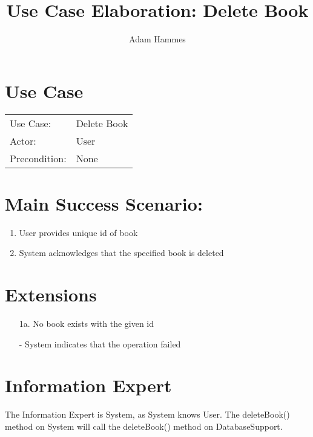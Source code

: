 \documentclass{article}
\title{Use Case Elaboration: Delete Book}
\author{ Adam Hammes }
\begin{document}
\maketitle


\section*{Use Case}
\begin{tabular}{l l}
Use Case:     & Delete Book\\
Actor:        & User\\
Precondition: & None\\
\end{tabular}


\section*{Main Success Scenario:}

\begin{enumerate}
    \item User provides unique id of book
    \item System acknowledges that the specified book is deleted

\end{enumerate}

\section*{Extensions}

\begin{itemize}
    \item [1a.] No book exists with the given id
                
    - System indicates that the operation failed

\end{itemize}


\section*{Information Expert}

The Information Expert is System, as System knows User.
The deleteBook() method on System will call the deleteBook() method on DatabaseSupport.
\end{document}
